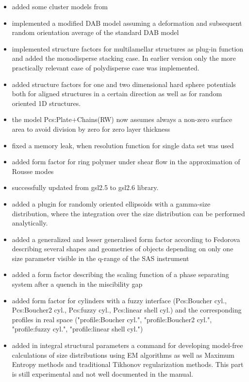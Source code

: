 \begin{description}
\begin{itemize}
    \item added some cluster models from \cite{Larsen2020}
    \item implemented a modified DAB model assuming a deformation and subsequent random orientation average of the standard DAB model
    \item implemented structure factors for multilamellar structures as plug-in function and added the monodisperse stacking case. In earlier version only the more practically relevant case of polydisperse case was implemented.
    \item added structure factors for one and two dimensional hard sphere potentials both for aligned structures in a certain direction as well as for random oriented 1D structures.
    \item the model Pcs:Plate+Chains(RW) now assumes always a non-zero surface area to avoid division by zero for zero layer thickness
    \item fixed a memory leak, when resolution function for single data set was used
    \item added form factor for ring polymer under shear flow in the approximation of Rousse modes
    \item successfully updated from gsl2.5 to gsl2.6 library.
    \item added a plugin for randomly oriented ellipsoids with a gamma-size distribution, where the integration over the size distribution can be performed analytically.
    \item added a generalized and lesser generalised form factor according to Fedorova describing several shapes and geometries of objects depending on only one size parameter visible in the q-range of the SAS instrument
    \item added a form factor describing the scaling function of a phase separating system after a quench in the miscibility gap
    \item added form factor for cylinders with a fuzzy interface (Pcs:Boucher cyl., Pcs:Boucher2 cyl., Pcs:fuzzy cyl., Pcs:linear shell cyl.) and the corresponding profiles in real space ("profile:Boucher cyl.", "profile:Boucher2 cyl.", "profile:fuzzy cyl.", "profile:linear shell cyl.")
    \item added in integral structural parameters a command for developing model-free calculations of size distributions using EM algorithms as well as Maximum Entropy methods and traditional Tikhonov regularization methods. This part is still experimental and not well documented in the manual.

\end{itemize}
\end{description}

